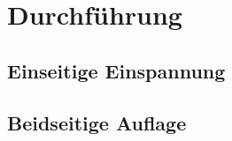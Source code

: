 \section{Durchführung}
\label{sec:Durchführung}

\subsection{Einseitige Einspannung}



\subsection{Beidseitige Auflage}